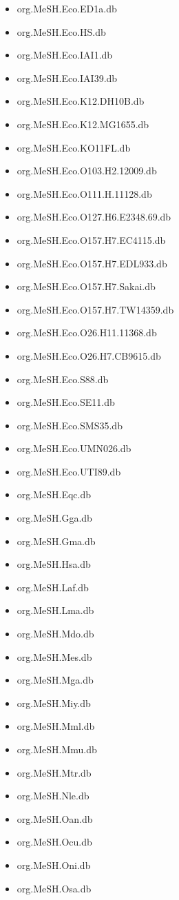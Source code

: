 \documentclass[margin,line,10pt]{res}
\newenvironment{list1}{
  \begin{list}{\ding{113}}{%
      \setlength{\itemsep}{0in}
      \setlength{\parsep}{0in} \setlength{\parskip}{0in}
      \setlength{\topsep}{0in} \setlength{\partopsep}{0in} 
      \setlength{\leftmargin}{0.17in}}}{\end{list}}
\begin{document}
\begin{resume}
\begin{list1}
\begin{multicols}{2}
\begin{itemize}
\item org.MeSH.Eco.ED1a.db 
\item org.MeSH.Eco.HS.db
\item org.MeSH.Eco.IAI1.db 
\item org.MeSH.Eco.IAI39.db 
\item org.MeSH.Eco.K12.DH10B.db
\item org.MeSH.Eco.K12.MG1655.db
\item org.MeSH.Eco.KO11FL.db 
\item org.MeSH.Eco.O103.H2.12009.db
\item org.MeSH.Eco.O111.H.11128.db 
\item org.MeSH.Eco.O127.H6.E2348.69.db
\item org.MeSH.Eco.O157.H7.EC4115.db
\item org.MeSH.Eco.O157.H7.EDL933.db 
\item org.MeSH.Eco.O157.H7.Sakai.db
\item org.MeSH.Eco.O157.H7.TW14359.db
\item org.MeSH.Eco.O26.H11.11368.db 
\item org.MeSH.Eco.O26.H7.CB9615.db 
\item org.MeSH.Eco.S88.db
\item org.MeSH.Eco.SE11.db 
\item org.MeSH.Eco.SMS35.db 
\item org.MeSH.Eco.UMN026.db
\item org.MeSH.Eco.UTI89.db 
\item org.MeSH.Eqc.db 
\item org.MeSH.Gga.db
\item org.MeSH.Gma.db 
\item org.MeSH.Hsa.db
\item org.MeSH.Laf.db 
\item org.MeSH.Lma.db 
\item org.MeSH.Mdo.db 
\item org.MeSH.Mes.db 
\item org.MeSH.Mga.db 
\item org.MeSH.Miy.db 
\item org.MeSH.Mml.db 
\item org.MeSH.Mmu.db 
\item org.MeSH.Mtr.db 
\item org.MeSH.Nle.db 
\item org.MeSH.Oan.db 
\item org.MeSH.Ocu.db 
\item org.MeSH.Oni.db 
\item org.MeSH.Osa.db 

\end{itemize}
\end{multicols}
\end{list1}
\end{resume}
\end{document}
